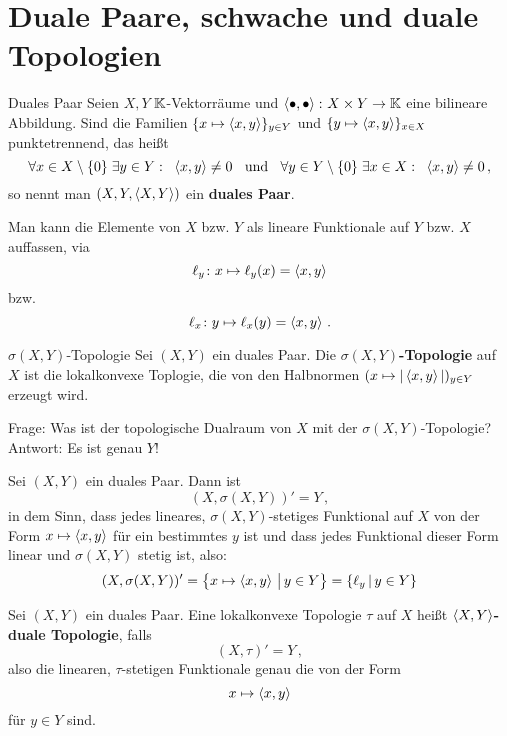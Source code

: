 \documentclass{article}
\begin{document}
	\section{Duale Paare, schwache und duale Topologien}
	
	\begin{Def}{Duales Paar}{}
		Seien $X,Y$ $\operatorname{\mathbb K}$-Vektorräume und $\left\langle \bullet,\bullet\right\rangle\colon X\times Y\to \operatorname{\mathbb K}$ eine bilineare Abbildung. Sind die Familien $\{x\mapsto \left\langle x,y\right\rangle\}_{y\in Y}$ und $\{y\mapsto \left\langle x,y\right\rangle\}_{x\in X}$ punktetrennend, das heißt
		\[\forall x\in X\setminus\{0\}\;\exists y\in Y:\;\;\left\langle x,y\right\rangle\ne 0\;\;\text{ und }\;\;\forall y\in Y\setminus\{0\}\;\exists x\in X:\;\;\left\langle x,y\right\rangle\ne 0\,,\]
		so nennt man $(X,Y,\left\langle X,Y\right\rangle)$ ein \textbf{duales Paar}.
	\end{Def}
	
	\begin{Bemerkung}{}{}
		Man kann die Elemente von $X$ bzw. $Y$ als lineare Funktionale auf $Y$ bzw. $X$ auffassen, via
		\[\ell_{y}\colon x\mapsto \ell_{y}(x)=\left\langle x,y\right\rangle\]
		bzw.
		\[\ell_{x}\colon y\mapsto \ell_{x}(y)=\left\langle x,y\right\rangle\,.\]
	\end{Bemerkung}
	
	
	\begin{Def}{$\sigma(X,Y)$-Topologie}{}
		Sei $(X,Y)$ ein duales Paar. Die \textbf{$\sigma(X,Y)$-Topologie} auf $X$ ist die lokalkonvexe Toplogie, die von den Halbnormen $(x\mapsto|\left\langle x,y\right\rangle|)_{y\in Y}$ erzeugt wird.
	\end{Def}
	
	
	Frage: Was ist der topologische Dualraum von $X$ mit der $\sigma(X,Y)$-Topologie?\\
	Antwort: Es ist genau $Y$!
	
	\begin{Kor}{}{}
		Sei $(X,Y)$ ein duales Paar. Dann ist
		\[(X,\sigma(X,Y))'=Y\,,\]
		in dem Sinn, dass jedes lineares, $\sigma(X,Y)$-stetiges Funktional auf $X$ von der Form $x\mapsto \left\langle x,y\right\rangle$ für ein bestimmtes $y$ ist und dass jedes Funktional dieser Form linear und $\sigma(X,Y)$ stetig ist, also:
		\[(X,\sigma(X,Y))'=\left\{x\mapsto \left\langle x,y\right\rangle\,\big|\, y\in Y\right\}=\{\ell_y\,|\, y\in Y\}\]
	\end{Kor}
	

	
	\begin{Def}{}{}
		Sei $(X,Y)$ ein duales Paar. Eine lokalkonvexe Topologie $\tau$ auf $X$ heißt \textbf{$\left\langle X,Y\right\rangle$-duale Topologie}, falls 
		\[(X,\tau)'=Y\,,\]
		also die linearen, $\tau$-stetigen Funktionale genau die von der Form
		\[x\mapsto\left\langle x,y\right\rangle\]
		für $y\in Y$ sind.
	\end{Def}
	
\end{document}
